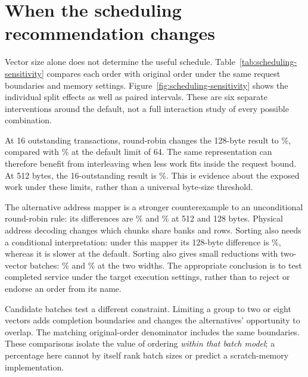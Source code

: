 \section{When the scheduling recommendation changes}
\label{sec:scheduling-results}
Vector size alone does not determine the useful schedule. Table~\ref{tab:scheduling-sensitivity} compares each order with original order under the same request boundaries and memory settings. Figure~\ref{fig:scheduling-sensitivity} shows the individual split effects as well as paired intervals. These are six separate interventions around the default, not a full interaction study of every possible combination.

\begin{table}[htbp]\centering\small
\caption[Scheduling sensitivity: paired comparisons]{Cycle differences (\%) from matching original-order BFS replay: mean and paired 95\% interval over ten reference splits. Negative means fewer service cycles. Only the named setting changes from the default; 128 bytes is a hypothetical footprint.}\label{tab:scheduling-sensitivity}
\resizebox{\textwidth}{!}{}
\end{table}

At 16 outstanding transactions, round-robin changes the 128-byte result to \SchedInflightSixteenRRCompact\%, compared with \SchedDefaultRRCompact\% at the default limit of 64. The same representation can therefore benefit from interleaving when less work fits inside the request bound. At 512 bytes, the 16-outstanding result is \SchedInflightSixteenRRFloat\%. This is evidence about the exposed work under these limits, rather than a universal byte-size threshold.

The alternative address mapper is a stronger counterexample to an unconditional round-robin rule: its differences are \SchedAlternateMappingRRFloat\% and \SchedAlternateMappingRRCompact\% at 512 and 128 bytes. Physical address decoding changes which chunks share banks and rows. Sorting also needs a conditional interpretation: under this mapper its 128-byte difference is \SchedAlternateMappingSortCompact\%, whereas it is slower at the default. Sorting also gives small reductions with two-vector batches: \SchedBatchTwoSortFloat\% and \SchedBatchTwoSortCompact\% at the two widths. The appropriate conclusion is to test completed service under the target execution settings, rather than to reject or endorse an order from its name.

Candidate batches test a different constraint. Limiting a group to two or eight vectors adds completion boundaries and changes the alternatives' opportunity to overlap. The matching original-order denominator includes the same boundaries. These comparisons isolate the value of ordering \emph{within that batch model}; a percentage here cannot by itself rank batch sizes or predict a scratch-memory implementation.

